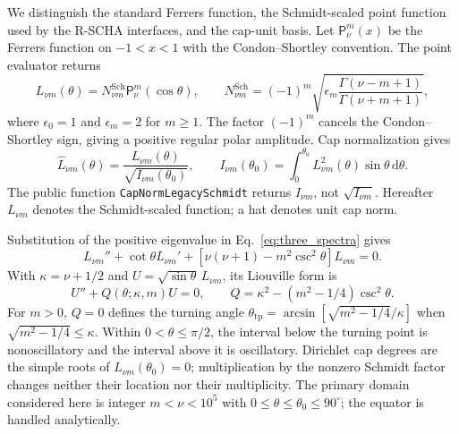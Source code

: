 ﻿\documentclass[11pt,a4paper]{article}
\newcommand{\dd}{\mathrm{d}}
\newcommand{\RSCHA}{\textsc{R-SCHA}\xspace}
\begin{document}
We distinguish the standard Ferrers function, the Schmidt-scaled point function used by the \RSCHA interfaces, and the cap-unit basis. Let $\mathsf P_\nu^m(x)$ be the Ferrers function on $-1<x<1$ with the Condon--Shortley convention. The point evaluator returns
\begin{equation}
 L_{\nu m}(\theta)
 =N_{\nu m}^{\mathrm{Sch}}\mathsf P_\nu^m(\cos\theta),
 \qquad
 N_{\nu m}^{\mathrm{Sch}}
 =(-1)^m\sqrt{\epsilon_m
 \frac{\Gamma(\nu-m+1)}{\Gamma(\nu+m+1)}},
 \label{eq:legendre_schmidt}
\end{equation}
where $\epsilon_0=1$ and $\epsilon_m=2$ for $m\geq1$. The factor $(-1)^m$ cancels the Condon--Shortley sign, giving a positive regular polar amplitude. Cap normalization gives
\begin{equation}
 \widehat L_{\nu m}(\theta)
 =\frac{L_{\nu m}(\theta)}{\sqrt{I_{\nu m}(\theta_0)}},
 \qquad
 I_{\nu m}(\theta_0)=\int_0^{\theta_0}L_{\nu m}^2(\theta)
 \sin\theta\,\dd\theta.
 \label{eq:legendre_cap_unit}
\end{equation}
The public function \texttt{CapNormLegacySchmidt} returns $I_{\nu m}$, not $\sqrt{I_{\nu m}}$. Hereafter $L_{\nu m}$ denotes the Schmidt-scaled function; a hat denotes unit cap norm.

Substitution of the positive eigenvalue in Eq.~\eqref{eq:three_spectra} gives
\begin{equation}
 L_{\nu m}''+\cot\theta L_{\nu m}'
 +\left[\nu(\nu+1)-m^2\csc^2\theta\right]L_{\nu m}=0.
 \label{eq:legendre_ode}
\end{equation}
With $\kappa=\nu+1/2$ and $U=\sqrt{\sin\theta}\,L_{\nu m}$, its Liouville form is
\begin{equation}
 U''+Q(\theta;\kappa,m)U=0,
 \qquad Q=\kappa^2-(m^2-1/4)\csc^2\theta.
 \label{eq:legendre_liouville}
\end{equation}
For $m>0$, $Q=0$ defines the turning angle
$\theta_{\mathrm{tp}}=\arcsin[\sqrt{m^2-1/4}/\kappa]$ when $\sqrt{m^2-1/4}\leq\kappa$. Within $0<\theta\leq\pi/2$, the interval below the turning point is nonoscillatory and the interval above it is oscillatory. Dirichlet cap degrees are the simple roots of $L_{\nu m}(\theta_0)=0$; multiplication by the nonzero Schmidt factor changes neither their location nor their multiplicity. The primary domain considered here is integer $m<\nu<10^5$ with $0\leq\theta\leq\theta_0\leq90^\circ$; the equator is handled analytically.
\end{document}
